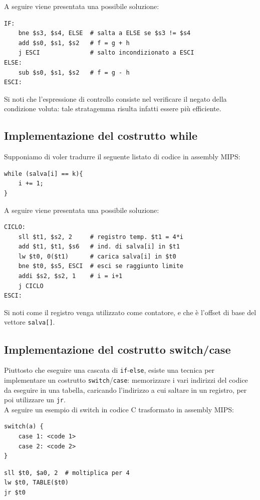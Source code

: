 \documentclass[class=book, crop=false, oneside]{standalone}
\begin{document}
A seguire viene presentata una possibile soluzione:
\begin{verbatim}
IF:
	bne $s3, $s4, ELSE  # salta a ELSE se $s3 != $s4
	add $s0, $s1, $s2   # f = g + h
	j ESCI              # salto incondizionato a ESCI
ELSE:
	sub $s0, $s1, $s2   # f = g - h
ESCI:
\end{verbatim}
Si noti che l'espressione di controllo consiste nel verificare il negato della condizione voluta: tale stratagemma risulta infatti essere più efficiente.

\subsection*{Implementazione del costrutto while}
Supponiamo di voler tradurre il seguente listato di codice in assembly MIPS:
\begin{verbatim}
while (salva[i] == k){
	i += 1;
}
\end{verbatim}

A seguire viene presentata una possibile soluzione:
\begin{verbatim}
CICLO:
	sll $t1, $s2, 2     # registro temp. $t1 = 4*i
	add $t1, $t1, $s6   # ind. di salva[i] in $t1
	lw $t0, 0($t1)      # carica salva[i] in $t0
	bne $t0, $s5, ESCI  # esci se raggiunto limite
	addi $s2, $s2, 1    # i = i+1
	j CICLO
ESCI:
\end{verbatim}
Si noti come il registro  venga utilizzato come contatore, e che  è l'offset di base del vettore \texttt{salva[]}.

\subsection*{Implementazione del costrutto switch/case}
Piuttosto che eseguire una cascata di \texttt{if}-\texttt{else}, esiste una tecnica per implementare un costrutto \texttt{switch}/\texttt{case}: memorizzare i vari indirizzi del codice da eseguire in una tabella, caricando l'indirizzo a cui saltare in un registro, per poi utilizzare un \texttt{jr}.\\
A seguire un esempio di switch in codice C trasformato in assembly MIPS:
\begin{verbatim}
switch(a) {
	case 1: <code 1>
	case 2: <code 2>
}
\end{verbatim}
\begin{verbatim}
sll $t0, $a0, 2  # moltiplica per 4
lw $t0, TABLE($t0)
jr $t0
\end{verbatim}
\end{document}
